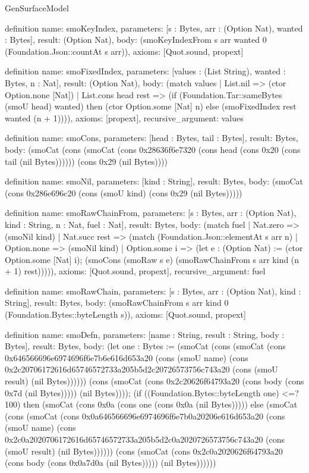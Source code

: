 \begin{lexlean}{GenSurfaceModel}
\begin{semanticmodule}
definition{
  name: smoKeyIndex,
  parameters: [s : Bytes, arr : (Option Nat), wanted : Bytes],
  result: (Option Nat),
  body: (smoKeyIndexFrom s arr wanted 0 (Foundation.Json::countAt s arr)),
  axioms: [Quot.sound, propext]
}

definition{
  name: smoFixedIndex,
  parameters: [values : (List String), wanted : Bytes, n : Nat],
  result: (Option Nat),
  body: (match values
    | List.nil => (ctor Option.none [Nat])
    | List.cons head rest => (if (Foundation.Tar::sameBytes (smoU head) wanted) then (ctor Option.some [Nat] n) else (smoFixedIndex rest wanted (n + 1)))),
  axioms: [propext],
  recursive_argument: values
}

definition{
  name: smoCons,
  parameters: [head : Bytes, tail : Bytes],
  result: Bytes,
  body: (smoCat (cons (smoCat (cons 0x28636f6e7320 (cons head (cons 0x20 (cons tail (nil Bytes)))))) (cons 0x29 (nil Bytes))))
}

definition{
  name: smoNil,
  parameters: [kind : String],
  result: Bytes,
  body: (smoCat (cons 0x286e696c20 (cons (smoU kind) (cons 0x29 (nil Bytes)))))
}

definition{
  name: smoRawChainFrom,
  parameters: [s : Bytes, arr : (Option Nat), kind : String, n : Nat, fuel : Nat],
  result: Bytes,
  body: (match fuel
    | Nat.zero => (smoNil kind)
    | Nat.succ rest => (match (Foundation.Json::elementAt s arr n)
      | Option.none => (smoNil kind)
      | Option.some i => (let e : (Option Nat) := (ctor Option.some [Nat] i); (smoCons (smoRaw s e) (smoRawChainFrom s arr kind (n + 1) rest))))),
  axioms: [Quot.sound, propext],
  recursive_argument: fuel
}

definition{
  name: smoRawChain,
  parameters: [s : Bytes, arr : (Option Nat), kind : String],
  result: Bytes,
  body: (smoRawChainFrom s arr kind 0 (Foundation.Bytes::byteLength s)),
  axioms: [Quot.sound, propext]
}

definition{
  name: smoDefn,
  parameters: [name : String, result : String, body : Bytes],
  result: Bytes,
  body: (let one : Bytes := (smoCat (cons (smoCat (cons 0x646566696e6974696f6e7b6e616d653a20 (cons (smoU name) (cons 0x2c20706172616d65746572733a205b5d2c20726573756c743a20 (cons (smoU result) (nil Bytes)))))) (cons (smoCat (cons 0x2c20626f64793a20 (cons body (cons 0x7d (nil Bytes))))) (nil Bytes)))); (if ((Foundation.Bytes::byteLength one) <=? 100) then (smoCat (cons 0x0a (cons one (cons 0x0a (nil Bytes))))) else (smoCat (cons (smoCat (cons 0x0a646566696e6974696f6e7b0a20206e616d653a20 (cons (smoU name) (cons 0x2c0a2020706172616d65746572733a205b5d2c0a2020726573756c743a20 (cons (smoU result) (nil Bytes)))))) (cons (smoCat (cons 0x2c0a2020626f64793a20 (cons body (cons 0x0a7d0a (nil Bytes))))) (nil Bytes))))))
}


\end{semanticmodule}
\end{lexlean}
